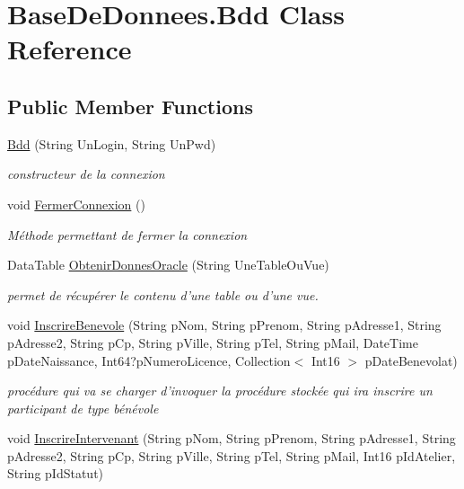 \hypertarget{class_base_de_donnees_1_1_bdd}{\section{Base\+De\+Donnees.\+Bdd Class Reference}
\label{class_base_de_donnees_1_1_bdd}
}
\subsection*{Public Member Functions}
\begin{DoxyCompactItemize}
\item 
\hyperlink{class_base_de_donnees_1_1_bdd_ab7425636f7b6865411160424455ddacf}{Bdd} (String Un\+Login, String Un\+Pwd)
\begin{DoxyCompactList}\small\item\em constructeur de la connexion \end{DoxyCompactList}\item 
void \hyperlink{class_base_de_donnees_1_1_bdd_aa75a70827f654db3f17b9451975446bb}{Fermer\+Connexion} ()
\begin{DoxyCompactList}\small\item\em Méthode permettant de fermer la connexion \end{DoxyCompactList}\item 
Data\+Table \hyperlink{class_base_de_donnees_1_1_bdd_a1f5203fd6378328a9545b47b7dd6bd97}{Obtenir\+Donnes\+Oracle} (String Une\+Table\+Ou\+Vue)
\begin{DoxyCompactList}\small\item\em permet de récupérer le contenu d'une table ou d'une vue. \end{DoxyCompactList}\item 
void \hyperlink{class_base_de_donnees_1_1_bdd_ac60e11f0e915babf2a78d168bf7a744e}{Inscrire\+Benevole} (String p\+Nom, String p\+Prenom, String p\+Adresse1, String p\+Adresse2, String p\+Cp, String p\+Ville, String p\+Tel, String p\+Mail, Date\+Time p\+Date\+Naissance, Int64?p\+Numero\+Licence, Collection$<$ Int16 $>$ p\+Date\+Benevolat)
\begin{DoxyCompactList}\small\item\em procédure qui va se charger d'invoquer la procédure stockée qui ira inscrire un participant de type bénévole \end{DoxyCompactList}\item 
void \hyperlink{class_base_de_donnees_1_1_bdd_abfbf2eb771a5e60ef361d5d9fc00304f}{Inscrire\+Intervenant} (String p\+Nom, String p\+Prenom, String p\+Adresse1, String p\+Adresse2, String p\+Cp, String p\+Ville, String p\+Tel, String p\+Mail, Int16 p\+Id\+Atelier, String p\+Id\+Statut)

\end{DoxyCompactItemize}
